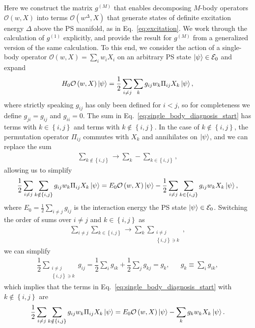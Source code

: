 \documentclass[nofootinbib,twocolumn]{revtex4-2}
\newcommand{\f}[2]{\dfrac{#1}{#2}} %
\newcommand{\p}[1]{\left(#1\right)} %
\renewcommand{\set}[1]{\left\{#1\right\}} %
\newcommand{\1}{\mathds{1}}
\newcommand{\E}{\mathcal{E}}
\renewcommand{\O}{\mathcal{O}}
\begin{document}
Here we construct the matrix $g^{(M)}$ that enables decomposing $M$-body operators $\O\p{w,X}$ into terms $\O\p{w^\Delta,X}$ that generate states of definite excitation energy $\Delta$ above the PS manifold, as in Eq.~\eqref{eq:excitation}.
We work through the calculation of $g^{(1)}$ explicitly, and provide the result for $g^{(M)}$ from a generalized version of the same calculation.
To this end, we consider the action of a single-body operator $\O\p{w,X}=\sum_iw_iX_i$ on an arbitrary PS state $\ket\psi\in\E_0$ and expand
\begin{align}
  H_0 \O\p{w,X} \ket\psi
  = \f12 \sum_{i\ne j} \sum_k g_{ij} w_k \Pi_{ij} X_k \ket\psi,
  \label{eq:single_body_diagnosis_start}
\end{align}
where strictly speaking $g_{ij}$ has only been defined for $i<j$, so for completeness we define $g_{ji}=g_{ij}$ and $g_{ii}=0$.
The sum in Eq.~\eqref{eq:single_body_diagnosis_start} has terms with $k\in\set{i,j}$ and terms with $k\notin\set{i,j}$.
In the case of $k\notin\set{i,j}$, the permutation operator $\Pi_{ij}$ commutes with $X_k$ and annihilates on $\ket\psi$, and we can replace the sum
\begin{align}
  \sum_{k\notin\set{i,j}} \to \sum_k - \sum_{k\in\set{i,j}},
\end{align}
allowing us to simplify
\begin{align}
  \f12 \sum_{i\ne j} \sum_{k\notin\set{i,j}}
  g_{ij} w_k \Pi_{ij} X_k \ket\psi
  = E_0 \O\p{w,X} \ket\psi
  - \f12 \sum_{i\ne j} \sum_{k\in\set{i,j}} g_{ij} w_k X_k \ket\psi,
\end{align}
where $E_0=\frac12\sum_{i\ne j}g_{ij}$ is the interaction energy the PS state $\ket\psi\in\E_0$.
Switching the order of sums over $i\ne j$ and $k\in\set{i,j}$ as
\begin{align}
  \sum_{i\ne j} \sum_{k\in\set{i,j}}
  \to \sum_k \sum_{\substack{i\ne j\\\set{i,j}\ni k}},
\end{align}
we can simplify
\begin{align}
  \f12 \sum_{\substack{i\ne j\\\set{i,j}\ni k}} g_{ij}
  = \f12 \sum_i g_{ik} + \f12 \sum_j g_{kj}
  = g_k,
  &&
  g_k \equiv \sum_i g_{ik},
\end{align}
which implies that the terms in Eq.~\eqref{eq:single_body_diagnosis_start}
with $k\notin\set{i,j}$ are
\begin{align}
  \f12 \sum_{i\ne j} \sum_{k\notin\set{i,j}}
  g_{ij} w_k \Pi_{ij} X_k \ket\psi
  = E_0 \O\p{w,X} \ket\psi - \sum_k g_k w_k X_k \ket\psi.
\end{align}
\end{document}
